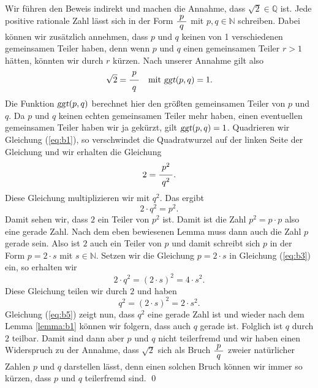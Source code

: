 \proof
Wir führen den Beweis indirekt und machen die Annahme, dass $\sqrt{2} \in \mathbb{Q}$ ist.  Jede positive
rationale Zahl lässt sich in der Form $\bruch{p}{q}$ mit $p,q \in \mathbb{N}$ schreiben.  Dabei können
wir zusätzlich annehmen, dass  $p$ und $q$ keinen von 1 verschiedenen gemeinsamen Teiler haben, denn
wenn $p$ und $q$ einen gemeinsamen Teiler $r > 1$ hätten, könnten wir durch $r$ kürzen.  Nach unserer 
Annahme gilt also
\begin{equation}
  \label{eq:b1}
  \sqrt{2} = \bruch{p}{q} \quad \mbox{mit $\textsl{ggt}(p,q) = 1$}.
\end{equation}
Die Funktion $\textsl{ggt}(p,q)$ berechnet hier den größten gemeinsamen Teiler von $p$ und $q$.   
Da $p$ und $q$ keinen echten gemeinsamen Teiler mehr haben, einen eventuellen gemeinsamen Teiler
haben wir ja gekürzt, gilt $\textsl{ggt}(p, q) = 1$.  Quadrieren wir  Gleichung (\ref{eq:b1}), so
verschwindet die Quadratwurzel auf der linken Seite der Gleichung und wir erhalten die Gleichung
\begin{equation}
  \label{eq:b2}
  2 = \bruch{p^2}{q^2}.
\end{equation}
Diese Gleichung multiplizieren wir mit $q^2$.  Das ergibt
\begin{equation}
  \label{eq:b3}
  2 \cdot q^2 = p^2.
\end{equation}
Damit sehen wir, dass $2$ ein Teiler von $p^2$ ist.  Damit ist die Zahl $p^2 = p \cdot p$ also eine gerade Zahl.
Nach dem eben bewiesenen Lemma muss dann auch die Zahl $p$ gerade sein.
Also ist $2$ auch ein Teiler von $p$ und damit schreibt sich $p$ in der Form $p = 2 \cdot s$ mit $s
\in \mathbb{N}$.  Setzen 
wir die Gleichung $p = 2 \cdot s$ in Gleichung (\ref{eq:b3}) ein, so erhalten wir 
\begin{equation}
  \label{eq:b4}
  2 \cdot q^2 = (2 \cdot s)^2 = 4 \cdot s^2.
\end{equation}
Diese Gleichung teilen wir durch $2$ und haben
\begin{equation}
  \label{eq:b5}
  q^2 = (2 \cdot s)^2 = 2 \cdot s^2.
\end{equation}
Gleichung (\ref{eq:b5}) zeigt nun, dass $q^2$ eine gerade Zahl ist und wieder nach dem Lemma
\ref{lemma:b1} können wir folgern, dass auch  $q$ gerade ist.  Folglich ist $q$ durch $2$ teilbar.
Damit sind dann aber $p$ und $q$ nicht teilerfremd und wir haben einen Widerspruch zu der
Annahme, dass $\sqrt{2}$ sich als Bruch $\bruch{p}{q}$ zweier natürlicher Zahlen $p$ und $q$
darstellen lässt, denn einen solchen Bruch können wir immer so kürzen, dass $p$ und $q$ teilerfremd
sind. 
\qed


